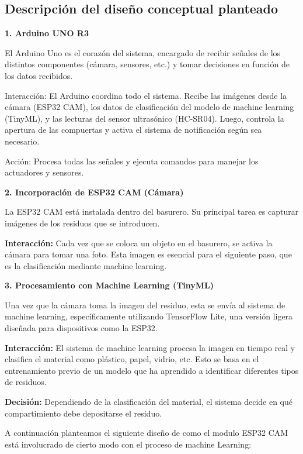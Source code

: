 
\subsection{Descripción del diseño conceptual planteado}
\textbf{1. Arduino UNO R3}

El Arduino Uno es el corazón del sistema, encargado de recibir señales de los distintos componentes (cámara, sensores, etc.) y tomar decisiones en función de los datos recibidos.

Interacción: El Arduino coordina todo el sistema. Recibe las imágenes desde la cámara (ESP32 CAM), los datos de clasificación del modelo de machine learning (TinyML), y las lecturas del sensor ultrasónico (HC-SR04). Luego, controla la apertura de las compuertas y activa el sistema de notificación según sea necesario.

Acción: Procesa todas las señales y ejecuta comandos para manejar los actuadores y sensores.

\textbf{2. Incorporación de ESP32 CAM (Cámara)} 

La ESP32 CAM está instalada dentro del basurero. Su principal tarea es capturar imágenes de los residuos que se introducen. 

	\textbf{Interacción:} Cada vez que se coloca un objeto en el basurero, se activa la cámara para tomar una foto. Esta imagen es esencial para el siguiente paso, que es la clasificación mediante machine learning. 

	\textbf{3. Procesamiento con Machine Learning (TinyML)} 

Una vez que la cámara toma la imagen del residuo, esta se envía al sistema de machine learning, específicamente utilizando TensorFlow Lite, una versión ligera diseñada para dispositivos como la ESP32. 

    \textbf{Interacción:} El sistema de machine learning procesa la imagen en tiempo real y clasifica el material como plástico, papel, vidrio, etc. Esto se basa en el entrenamiento previo de un modelo que ha aprendido a identificar diferentes tipos de residuos. 

	\textbf{Decisión:} Dependiendo de la clasificación del material, el sistema decide en qué compartimiento debe depositarse el residuo. 

A continuación planteamos el siguiente diseño de como el modulo ESP32 CAM está involucrado de cierto modo con el proceso de machine Learning:


